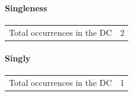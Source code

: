 		\paragraph{Singleness}
	
			\begin{tabular}{ll}
				Total occurrences in the DC & 2
			\end{tabular}
			
			\begin{compactdesc}
				\item[{\hyperref[DC36-7]{DC 36:7}}]
				\item[{\hyperref[DC59-13]{DC 59:13}}]
			\end{compactdesc}
			
		\paragraph{Singly}
	
			\begin{tabular}{ll}
				Total occurrences in the DC & 1
			\end{tabular}
			
			\begin{compactdesc}
				\item[{\hyperref[DC132-17]{DC 132:17}}]
			\end{compactdesc}
		
	
		
		

	
